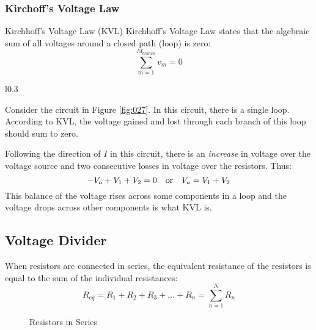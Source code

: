 \documentclass[12pt]{article}
\begin{document}
\subsubsection{Kirchoff's Voltage Law}
\label{sssec:kirchoffsVoltageLaw}

\begin{definition}{Kirchhoff's Voltage Law (KVL)}
  Kirchhoff's Voltage Law states that the algebraic sum of all voltages around a closed path (loop) is zero:
  \begin{equation*}
    \sum_{m=1}^{M_{branch}} v_m = 0
  \end{equation*}
\end{definition}

\begin{wrapfigure}[11]{l}{0.3\textwidth}
  \vspace{-25pt}
  \centering
  
  \caption{KVL}
  \label{fig:027}
\end{wrapfigure}

Consider the circuit in Figure \ref{fig:027}. In this circuit, there is a single loop. According to KVL, the voltage gained and lost through each branch of this loop should sum to zero.

Following the direction of $I$ in this circuit, there is an \textit{increase} in voltage over the voltage source and two consecutive losses in voltage over the resistors. Thus:
\begin{equation*}
  -V_a + V_1 + V_2 = 0\ \ \ \textup{or}\ \ \ V_a = V_1 + V_2
\end{equation*}
This balance of the voltage rises across some components in a loop and the voltage drops across other components is what KVL is.

\subsection{Voltage Divider}
\label{ssec:voltageDivider}

When resistors are connected in series, the equivalent resistance of the resistors is equal to the sum of the individual resistances:
\begin{equation*}
  R_{eq} = R_1 + R_2 + R_3 + \hdots + R_n = \sum_{n=1}^{N} R_n
\end{equation*}

\begin{figure}[H]
  \vspace{-20pt}
  \centering
  
  \caption{Resistors in Series}
  \label{fig:resistorsInSeries}
\end{figure}
\end{document}
